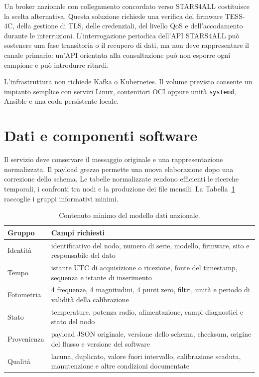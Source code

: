 \documentclass[11pt,a4paper]{report}
\begin{document}
Un broker nazionale con collegamento concordato verso STARS4ALL costituisce la scelta alternativa. Questa soluzione richiede una verifica del firmware TESS-4C, della gestione di TLS, delle credenziali, del livello QoS e dell'accodamento durante le interruzioni. L'interrogazione periodica dell'API STARS4ALL può sostenere una fase transitoria o il recupero di dati, ma non deve rappresentare il canale primario: un'API orientata alla consultazione può non esporre ogni campione e può introdurre ritardi.

L'infrastruttura non richiede Kafka o Kubernetes. Il volume previsto consente un impianto semplice con servizi Linux, contenitori OCI oppure unità \texttt{systemd}, Ansible e una coda persistente locale.

\section*{Dati e componenti software}

Il servizio deve conservare il messaggio originale e una rappresentazione normalizzata. Il payload grezzo permette una nuova elaborazione dopo una correzione dello schema. Le tabelle normalizzate rendono efficienti le ricerche temporali, i confronti tra nodi e la produzione dei file mensili. La Tabella~\ref{tab:dati} raccoglie i gruppi informativi minimi.

\begin{table}[ht!]
\centering
\renewcommand{\arraystretch}{1.5}
\small

\begin{tabularx}{\linewidth}{@{}l X@{}}
\toprule
Gruppo & Campi richiesti \\
\midrule
Identità & identificativo del nodo, numero di serie, modello, firmware, sito e responsabile del dato \\
Tempo & istante UTC di acquisizione o ricezione, fonte del timestamp, sequenza e istante di inserimento \\
Fotometria & 4 frequenze, 4 magnitudini, 4 punti zero, filtri, unità e periodo di validità della calibrazione \\
Stato & temperature, potenza radio, alimentazione, campi diagnostici e stato del nodo \\
Provenienza & payload JSON originale, versione dello schema, checksum, origine del flusso e versione del software \\
Qualità & lacuna, duplicato, valore fuori intervallo, calibrazione scaduta, manutenzione e altre condizioni documentate \\
\bottomrule
\end{tabularx}

\caption{Contenuto minimo del modello dati nazionale.}
\label{tab:dati}
\end{table}
\end{document}
